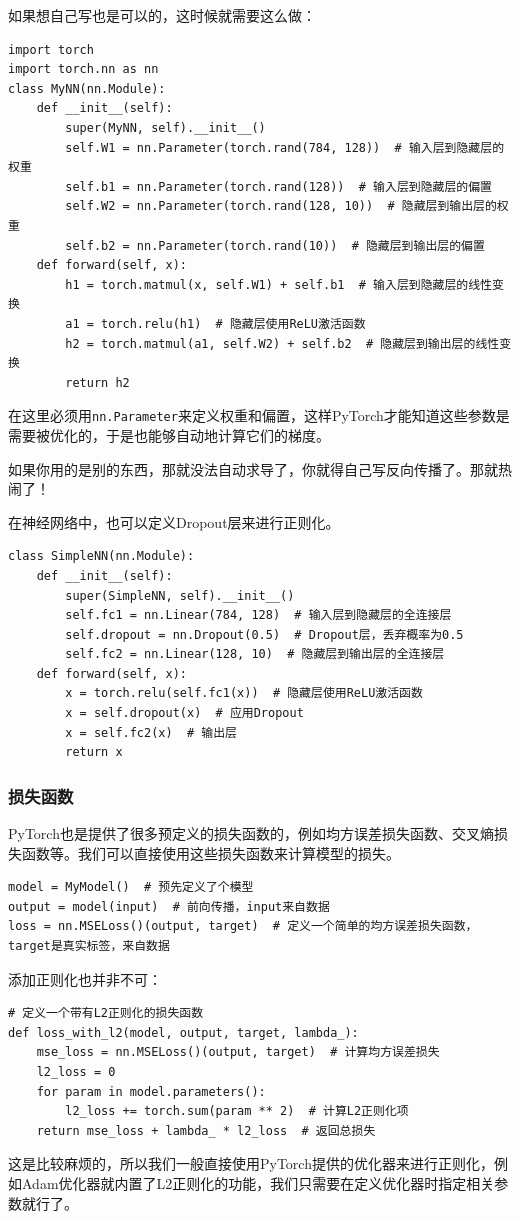 \documentclass[fontset=none]{ctexart}
\begin{document}
如果想自己写也是可以的，这时候就需要这么做：
\begin{verbatim}
import torch
import torch.nn as nn
class MyNN(nn.Module):
    def __init__(self):
        super(MyNN, self).__init__()
        self.W1 = nn.Parameter(torch.rand(784, 128))  # 输入层到隐藏层的权重
        self.b1 = nn.Parameter(torch.rand(128))  # 输入层到隐藏层的偏置
        self.W2 = nn.Parameter(torch.rand(128, 10))  # 隐藏层到输出层的权重
        self.b2 = nn.Parameter(torch.rand(10))  # 隐藏层到输出层的偏置
    def forward(self, x):
        h1 = torch.matmul(x, self.W1) + self.b1  # 输入层到隐藏层的线性变换
        a1 = torch.relu(h1)  # 隐藏层使用ReLU激活函数
        h2 = torch.matmul(a1, self.W2) + self.b2  # 隐藏层到输出层的线性变换
        return h2
\end{verbatim}
在这里必须用\texttt{nn.Parameter}来定义权重和偏置，这样PyTorch才能知道这些参数是需要被优化的，于是也能够自动地计算它们的梯度。

如果你用的是别的东西，那就没法自动求导了，你就得自己写反向传播了。那就热闹了！

在神经网络中，也可以定义Dropout层来进行正则化。
\begin{verbatim}
class SimpleNN(nn.Module):
    def __init__(self):
        super(SimpleNN, self).__init__()
        self.fc1 = nn.Linear(784, 128)  # 输入层到隐藏层的全连接层
        self.dropout = nn.Dropout(0.5)  # Dropout层，丢弃概率为0.5
        self.fc2 = nn.Linear(128, 10)  # 隐藏层到输出层的全连接层
    def forward(self, x):
        x = torch.relu(self.fc1(x))  # 隐藏层使用ReLU激活函数
        x = self.dropout(x)  # 应用Dropout
        x = self.fc2(x)  # 输出层
        return x
\end{verbatim}

\subsubsection{损失函数}

PyTorch也是提供了很多预定义的损失函数的，例如均方误差损失函数、交叉熵损失函数等。我们可以直接使用这些损失函数来计算模型的损失。
\begin{verbatim}
model = MyModel()  # 预先定义了个模型
output = model(input)  # 前向传播，input来自数据
loss = nn.MSELoss()(output, target)  # 定义一个简单的均方误差损失函数，target是真实标签，来自数据
\end{verbatim}

添加正则化也并非不可：
\begin{verbatim}
# 定义一个带有L2正则化的损失函数
def loss_with_l2(model, output, target, lambda_):
    mse_loss = nn.MSELoss()(output, target)  # 计算均方误差损失
    l2_loss = 0
    for param in model.parameters():
        l2_loss += torch.sum(param ** 2)  # 计算L2正则化项
    return mse_loss + lambda_ * l2_loss  # 返回总损失
\end{verbatim}
这是比较麻烦的，所以我们一般直接使用PyTorch提供的优化器来进行正则化，例如Adam优化器就内置了L2正则化的功能，我们只需要在定义优化器时指定相关参数就行了。
\end{document}
